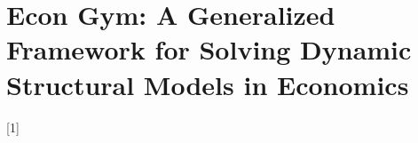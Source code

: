 
\graphicspath{{../Econ Gym Working Paper/}{../Econ Gym Working Paper/Figures/}}

\chapter{Econ Gym: A Generalized Framework for Solving Dynamic Structural Models in Economics}
\label{ch:econgym}

\begingroup

\renewcommand{\maketitle}{}%
\renewcommand{\title}[1]{}%
\renewcommand{\author}[1]{}%
\renewcommand{\date}[1]{}%

\let\origtoc\tableofcontents
\renewcommand{\tableofcontents}{}%

\let\origbibliographystyle
\renewcommand{}[1]{}%

\renewcommand{\appendix}{}%



\let\tableofcontents\origtoc
\let\origbibliographystyle

\endgroup
